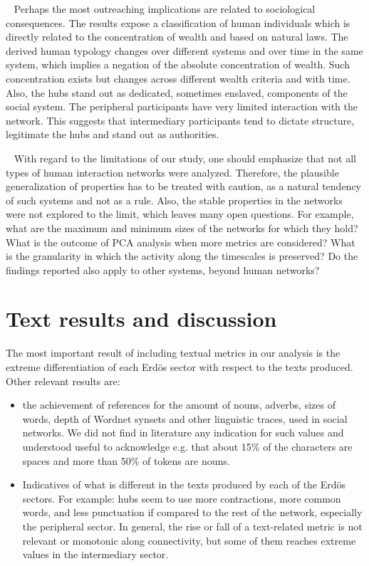  
Perhaps the most outreaching implications are related to sociological consequences. The results expose a classification of human individuals which is directly related to the concentration of wealth and based on natural laws. The derived human typology changes over different systems and over time in the same system, which implies a negation of the absolute concentration of wealth. Such concentration exists but changes across different wealth criteria and with time. Also, the hubs stand out as dedicated, sometimes enslaved,
components of the social system. The peripheral participants have very limited interaction with the network. This suggests that intermediary participants tend to dictate structure, legitimate the hubs and stand out as authorities.

 
With regard to the limitations of our study, one should emphasize that not all types of human interaction networks were analyzed. Therefore, the plausible generalization of properties has to be treated with caution, as a natural tendency of such systems and not as a rule. Also, the stable properties in the networks were not explored to the limit, which leaves many open questions. For example, what are the maximum and minimum sizes of the networks for which they hold? What is the outcome of PCA analysis when more metrics are considered? What is the granularity in which the activity along the timescales is preserved? Do the findings reported also apply to other systems, beyond human networks?
 
\section{Text results and discussion}\label{sec:tresults}

The most important result of including textual metrics in our analysis is the
extreme differentiation of each Erd\"os sector with respect to the texts produced.
Other relevant results are:
\begin{itemize}
	\item the achievement of references for the amount of nouns, adverbs, sizes of words, depth of Wordnet synsets and other linguistic traces, used in social networks.
		We did not find in literature any indication for such values and understood useful to acknowledge e.g. that about 15\% of the characters are spaces and more than 50\% of tokens are nouns.
	\item Indicatives of what is different in the texts produced by each of the Erd\"os sectors.
		For example: hubs seem to use more contractions,
		more common words, and less punctuation if compared to the rest of the network,
		especially the peripheral sector.
		In general, the rise or fall of a text-related metric is not relevant or monotonic along connectivity,
		but some of them reaches extreme values in the intermediary sector.
\end{itemize}

